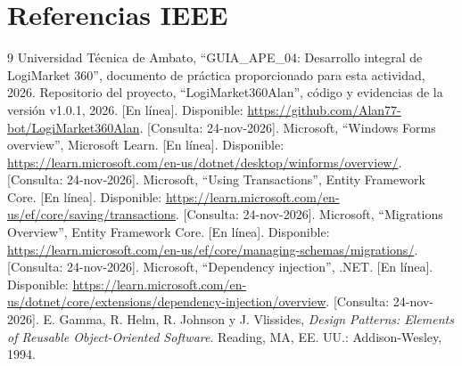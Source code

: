 
\section{Referencias IEEE}
\begingroup\small
\renewcommand{\section}[2]{}
\begin{thebibliography}{9}
 Universidad Técnica de Ambato, ``GUIA\_APE\_04: Desarrollo integral de LogiMarket 360'', documento de práctica proporcionado para esta actividad, 2026.
 Repositorio del proyecto, ``LogiMarket360Alan'', código y evidencias de la versión v1.0.1, 2026. [En línea]. Disponible: \url{https://github.com/Alan77-bot/LogiMarket360Alan}. [Consulta: 24-nov-2026].
 Microsoft, ``Windows Forms overview'', Microsoft Learn. [En línea]. Disponible: \url{https://learn.microsoft.com/en-us/dotnet/desktop/winforms/overview/}. [Consulta: 24-nov-2026].
 Microsoft, ``Using Transactions'', Entity Framework Core. [En línea]. Disponible: \url{https://learn.microsoft.com/en-us/ef/core/saving/transactions}. [Consulta: 24-nov-2026].
 Microsoft, ``Migrations Overview'', Entity Framework Core. [En línea]. Disponible: \url{https://learn.microsoft.com/en-us/ef/core/managing-schemas/migrations/}. [Consulta: 24-nov-2026].
 Microsoft, ``Dependency injection'', .NET. [En línea]. Disponible: \url{https://learn.microsoft.com/en-us/dotnet/core/extensions/dependency-injection/overview}. [Consulta: 24-nov-2026].
 E. Gamma, R. Helm, R. Johnson y J. Vlissides, \textit{Design Patterns: Elements of Reusable Object-Oriented Software}. Reading, MA, EE. UU.: Addison-Wesley, 1994.
\end{thebibliography}
\endgroup
